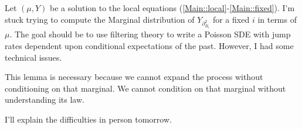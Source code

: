 \documentclass[12pt]{article}
\newcommand{\ind}{\hspace{24pt}}
\newcommand{\vcomp}[1]{_{#1}}						%
\newcommand{\dneigh}[1]{\partial^2_{#1}}
\newcommand{\Xg}{Y}
\begin{document}
Let \((\mu,\Xg)\) be a solution to the local equations (\eqref{Main::local}-\eqref{Main::fixed}). I'm stuck trying to compute the Marginal distribution of \(\Xg\vcomp{\dneigh{B_i}}\) for a fixed \(i\) in terms of \(\mu\). The goal should be to use filtering theory to write a Poisson SDE with jump rates dependent upon conditional expectations of the past. However, I had some technical issues.

\ind This lemma is necessary because we cannot expand the process without conditioning on that marginal. We cannot condition on that marginal without understanding its law.

\ind I'll explain the difficulties in person tomorrow.
\newpage


\end{document}
